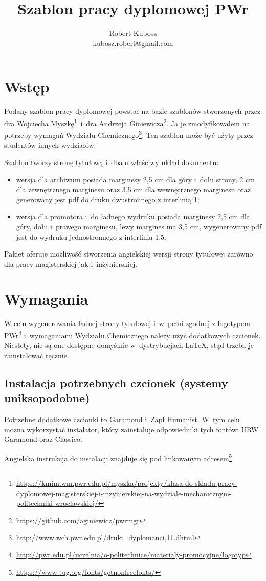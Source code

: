 \documentclass[12pt,a4paper]{article}
\author{Robert Kubosz \\ \href{mailto:kubosz.robert@gmail.com}{kubosz.robert@gmail.com}}
\title{Szablon pracy dyplomowej PWr}
\begin{document}
\maketitle
\section{Wstęp}
\label{sec:wstep}
\par Podany szablon pracy dyplomowej powstał na bazie szablonów stworzonych przez dra Wojciecha Myszkę\footnote{\url{https://kmim.wm.pwr.edu.pl/myszka/projekty/klasa-do-skladu-pracy-dyplomowej-magisterskiej-i-inzynierskiej-na-wydziale-mechanicznym-politechniki-wroclawskiej/}}~i~dra Andrzeja Giniewicza\footnote{\url{https://github.com/aginiewicz/pwrmgr}}.
Ja je zmodyfikowałem na potrzeby wymagań Wydziału Chemicznego\footnote{\url{http://www.wch.pwr.edu.pl/druki_dyplomanci,11.dhtml}}. Ten szablon może być użyty przez studentów innych wydziałów.
\par Szablon tworzy stronę tytułową i~dba o właściwy układ dokumentu:
\begin{itemize}
    \item wersja dla archiwum posiada marginesy 2,5 cm dla góry i~dołu strony, 2 cm dla zewnętrznego marginesu oraz 3,5 cm dla wewnętrznego marginesu oraz generowany jest pdf do druku dwustronnego z interlinią 1;
    \item wersja dla promotora i~do ładnego wydruku posiada marginesy 2,5 cm dla góry, dołu i~prawego marginesu, lewy margines ma 3,5 cm, wygenerowany pdf jest do wydruku jednostronnego z interlinią 1,5.
\end{itemize}
Pakiet oferuje możliwość stworzenia angielskiej wersji strony tytułowej zarówno dla pracy magisterskiej jak i~inżynierskiej.

\section{Wymagania}
\par W celu wygenerowania ładnej strony tytułowej i~w~pełni zgodnej  z logotypem PWr\footnote{\url{http://pwr.edu.pl/uczelnia/o-politechnice/materialy-promocyjne/logotyp}} i~wymaganiami Wydziału Chemicznego należy użyć dodatkowych czcionek. Niestety, nie są one dostępne domyślnie w~dystrybucjach \LaTeX, stąd trzeba je zainstalować ręcznie.

\subsection{Instalacja potrzebnych czcionek (systemy uniksopodobne)}
Potrzebne dodatkowe czcionki to Garamond i~Zapf Humanist. W~tym celu można wykorzystać instalator, który zainstaluje odpowiedniki tych fontów: URW Garamond oraz Classico. 
\par Angielska instrukcja do instalacji znajduje się pod linkowanym adresem\footnote{\url{https://www.tug.org/fonts/getnonfreefonts/}}.
\end{document}
